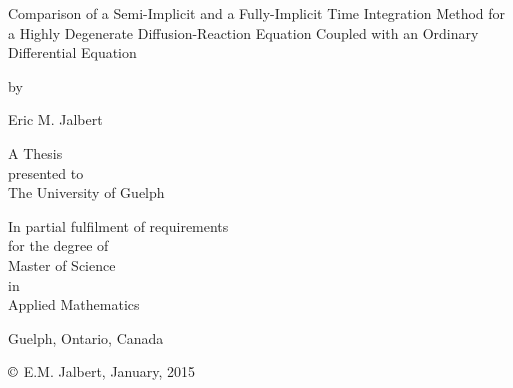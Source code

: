 \begin{titlepage}
  \begin{center}
    \vspace*{4cm}
    \LARGE\large{Comparison of a Semi-Implicit and a Fully-Implicit Time Integration Method for a Highly Degenerate Diffusion-Reaction Equation Coupled with an Ordinary Differential Equation}
    \vspace*{0.5cm}
    
    \small{by}
    \vspace*{0.5cm}
    
    \large{Eric M. Jalbert}
    \vspace*{3.5cm}
    
    A Thesis\\presented to\\The University of Guelph
    \vspace*{1.5cm}
    
    In partial fulfilment of requirements\\for the degree of\\Master of Science\\in\\Applied Mathematics
    \vfill

    Guelph, Ontario, Canada
    
    $\copyright$ E.M. Jalbert, January, 2015
  \end{center}
\end{titlepage}






